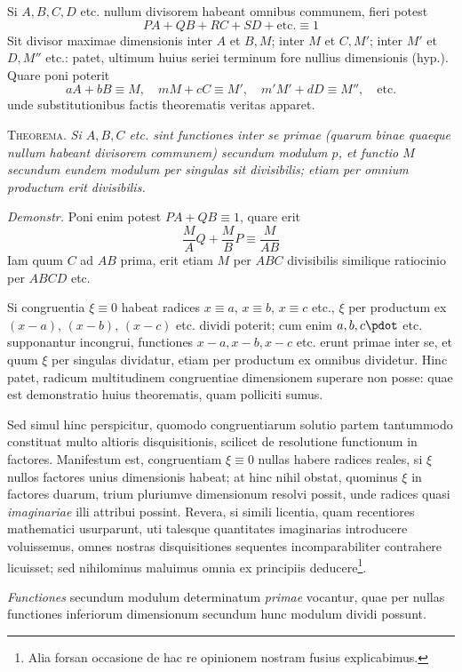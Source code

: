 Si $A,B,C,D$ etc. nullum divisorem habeant omnibus communem, fieri potest
\[
PA+QB+RC+SD+\text{etc.}\equiv1
\]
Sit divisor maximae dimensionis inter $A$ et $B,M$; inter $M$ et $C,M'$; inter $M'$ et $D,M''$ etc.: patet, ultimum huius seriei terminum fore nullius dimensionis (hyp.). Quare poni poterit
\[
aA+bB\equiv M,\quad mM+cC\equiv M',\quad m'M'+dD\equiv M'',\quad\text{etc.}
\]
unde substitutionibus factis theorematis veritas apparet.

\textsc{Theorema.} \emph{Si $A,B,C$ etc. sint functiones inter se primae (quarum binae quaeque nullum habeant divisorem communem) secundum modulum $p$, et functio $M$ secundum eundem modulum per singulas sit divisibilis; etiam per omnium productum erit divisibilis.}

\emph{Demonstr.} Poni enim potest $PA+QB\equiv1$, quare erit
\[
\frac MA Q+\frac MB P\equiv\frac M{AB}
\]
Iam quum $C$ ad $AB$ prima, erit etiam $M$ per $ABC$ divisibilis similique ratiocinio per $ABCD$ etc.

Si congruentia $\xi\equiv0$ habeat radices $x\equiv a$, $x\equiv b$, $x\equiv c$ etc., $\xi$ per productum ex $(x-a)$, $(x-b)$, $(x-c)$ etc. dividi poterit; cum enim $a,b,c\pdot$ etc. supponantur incongrui, functiones $x-a,x-b,x-c$ etc. erunt primae inter se, et quum $\xi$ per singulas dividatur, etiam per productum ex omnibus dividetur. Hinc patet, radicum multitudinem congruentiae dimensionem superare non posse: quae est demonstratio huius theorematis, quam polliciti sumus.

Sed simul hinc perspicitur, quomodo congruentiarum solutio partem tantummodo constituat multo altioris disquisitionis, scilicet de resolutione functionum in factores. Manifestum est, congruentiam $\xi\equiv0$ nullas habere radices reales, si $\xi$ nullos factores unius dimensionis habeat; at hinc nihil obstat, quominus $\xi$ in factores duarum, trium pluriumve dimensionum resolvi possit, unde radices quasi \emph{imaginariae} illi attribui possint. Revera, si simili licentia, quam recentiores mathematici usurparunt, uti talesque quantitates imaginarias introducere 
voluissemus, omnes nostras disquisitiones sequentes incomparabiliter contrahere licuisset; sed nihilominus maluimus omnia ex principiis deducere\begingroup\renewcommand{\thefootnote}{*)}\footnote{Alia forsan occasione de hac re opinionem nostram fusius explicabimus.}\endgroup.

\emph{Functiones} secundum modulum determinatum \emph{primae} vocantur, quae per nullas functiones inferiorum dimensionum secundum hunc modulum dividi possunt.

